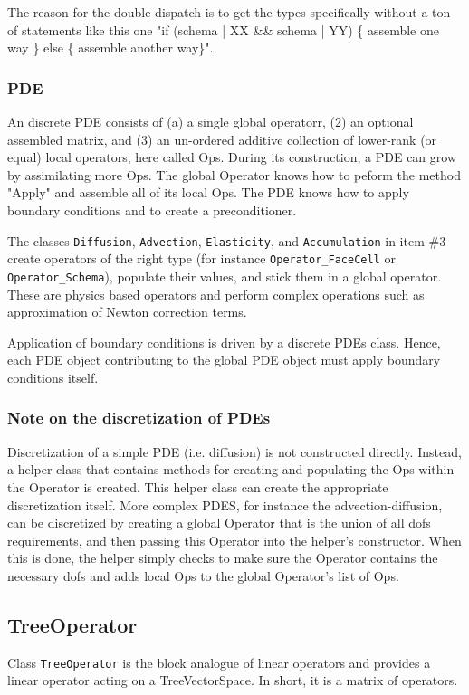 The reason for the double dispatch is to get the types specifically
without a ton of statements like this one "if (schema | XX \&\& schema | YY) 
\{ assemble one way \} else \{ assemble another way\}".


\subsubsection{PDE}
An discrete PDE consists of (a) a single global operatorr, (2) an 
optional assembled matrix, and (3) an un-ordered additive collection of 
lower-rank (or equal) local operators, here called Ops. 
During its construction, a PDE can grow by assimilating more Ops. 
The global Operator knows how to peform the method "Apply" and assemble 
all of its local Ops.
The PDE knows how to apply boundary conditions and to create a preconditioner.

The classes {\tt Diffusion}, {\tt Advection}, {\tt Elasticity},  
and {\tt Accumulation} in item \#3 create operators of the right type (for instance 
{\tt Operator\_FaceCell} or {\tt Operator\_Schema}), populate their values, and stick 
them in a global operator.
These are physics based operators and perform complex operations such as approximation
of Newton correction terms.

Application of boundary conditions is driven by a discrete PDEs class. 
Hence, each PDE object contributing to the global PDE object must apply
boundary conditions itself.


\subsubsection{Note on the discretization of PDEs}
Discretization of a simple 
PDE (i.e. diffusion) is not constructed directly. 
Instead, a helper class that contains methods for creating and populating 
the Ops within the Operator is created. This helper class can create the
appropriate discretization itself. More complex PDES, for instance the
advection-diffusion, can be discretized by creating a global Operator that 
is the union of all dofs requirements, and then passing this Operator
into the helper's constructor. When this is done, the helper simply 
checks to make sure the Operator contains the necessary dofs and
adds local Ops to the global Operator's list of Ops.


\subsection{TreeOperator}
Class {\tt TreeOperator} is the block analogue of linear operators and 
provides a linear operator acting on a TreeVectorSpace. 
In short, it is a matrix of operators.

